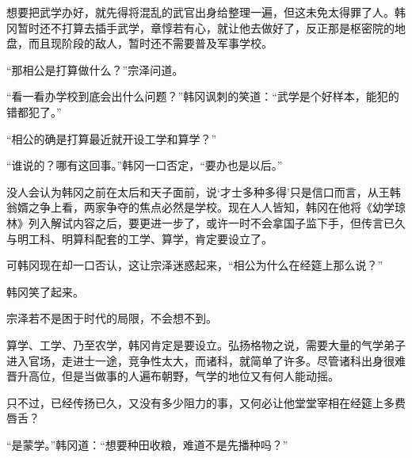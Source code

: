 想要把武学办好，就先得将混乱的武官出身给整理一遍，但这未免太得罪了人。韩冈暂时还不打算去插手武学，章惇若有心，就让他去做好了，反正那是枢密院的地盘，而且现阶段的敌人，暂时还不需要普及军事学校。

“那相公是打算做什么？”宗泽问道。

“看一看办学校到底会出什么问题？”韩冈讽刺的笑道：“武学是个好样本，能犯的错都犯了。”

“相公的确是打算最近就开设工学和算学？”

“谁说的？哪有这回事。”韩冈一口否定，“要办也是以后。”

没人会认为韩冈之前在太后和天子面前，说‘才士多种多得’只是信口而言，从王韩翁婿之争上看，两家争夺的焦点必然是学校。现在人人皆知，韩冈在他将《幼学琼林》列入解试内容之后，要更进一步了，或许一时不会拿国子监下手，但传言已久与明工科、明算科配套的工学、算学，肯定要设立了。

可韩冈现在却一口否认，这让宗泽迷惑起来，“相公为什么在经筵上那么说？”

韩冈笑了起来。

宗泽若不是困于时代的局限，不会想不到。

算学、工学、乃至农学，韩冈肯定是要设立。弘扬格物之说，需要大量的气学弟子进入官场，走进士一途，竞争性太大，而诸科，就简单了许多。尽管诸科出身很难晋升高位，但是当做事的人遍布朝野，气学的地位又有何人能动摇。

只不过，已经传扬已久，又没有多少阻力的事，又何必让他堂堂宰相在经筵上多费唇舌？

“是蒙学。”韩冈道：“想要种田收粮，难道不是先播种吗？”

